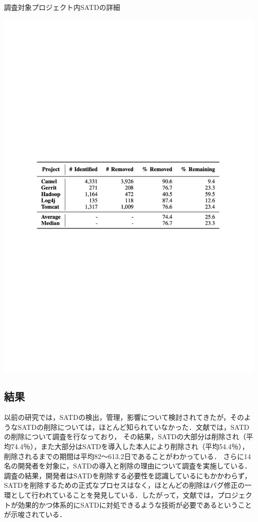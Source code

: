 \begin{table}[t]
    \centering
    \caption{調査対象プロジェクト内SATDの詳細}
    \includegraphics[width=0.9\linewidth, angle=0]{./thesis1/data-satd-table1.pdf}
    \label{fig:1_data-satd-table}
\end{table}



\subsection{結果}
以前の研究では，SATDの検出，管理，影響について検討されてきたが，そのようなSATDの削除については，ほとんど知られていなかった．文献\cite{satd-removal}では，SATDの削除について調査を行なっており，
その結果，SATDの大部分は削除され（平均74.4％），また大部分はSATDを導入した本人により削除され（平均54.4％），削除されるまでの期間は平均82～613.2日であることがわかっている．
さらに14名の開発者を対象に，SATDの導入と削除の理由について調査を実施している．調査の結果，開発者はSATDを削除する必要性を認識しているにもかかわらず，SATDを削除するための正式なプロセスはなく，ほとんどの削除はバグ修正の一環として行われていることを発見している．したがって，文献\cite{satd-removal}では，プロジェクトが効果的かつ体系的にSATDに対処できるような技術が必要であるということが示唆されている．



